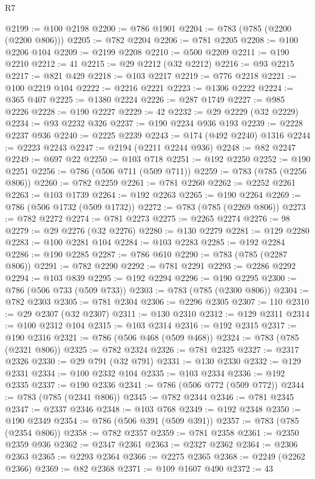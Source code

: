 \begin{lexlean}{R7}
\begin{coremodule}
@2199 := @100 @2198
@2200 := @786 @1901
@2204 := @783 (@785 (@2200 (@2200 @806)))
@2205 := @782 @2204
@2206 := @781 @2205
@2208 := @100 @2206 @104
@2209 := @2199 @2208
@2210 := @500 @2209
@2211 := @190 @2210
@2212 := 41
@2215 := @29 @2212 (@32 @2212)
@2216 := @93 @2215
@2217 := @821 @429
@2218 := @103 @2217
@2219 := @776 @2218
@2221 := @100 @2219 @104
@2222 := @2216 @2221
@2223 := @1306 @2222
@2224 := @365 @407
@2225 := @1380 @2224
@2226 := @287 @1749
@2227 := @985 @2226
@2228 := @190 @2227
@2229 := 42
@2232 := @29 @2229 (@32 @2229)
@2234 := @93 @2232 @326
@2237 := @190 @2234 @936 @193
@2239 := @2228 @2237 @936
@2240 := @2225 @2239
@2243 := @174 (@492 @2240) @1316
@2244 := @2223 @2243
@2247 := @2194 (@2211 @2244 @936)
@2248 := @82 @2247
@2249 := @697 @22
@2250 := @103 @718
@2251 := @192 @2250
@2252 := @190 @2251
@2256 := @786 (@506 @711 (@509 @711))
@2259 := @783 (@785 (@2256 @806))
@2260 := @782 @2259
@2261 := @781 @2260
@2262 := @2252 @2261
@2263 := @103 @1739
@2264 := @192 @2263
@2265 := @190 @2264
@2269 := @786 (@506 @1732 (@509 @1732))
@2272 := @783 (@785 (@2269 @806))
@2273 := @782 @2272
@2274 := @781 @2273
@2275 := @2265 @2274
@2276 := 98
@2279 := @29 @2276 (@32 @2276)
@2280 := @130 @2279
@2281 := @129 @2280
@2283 := @100 @2281 @104
@2284 := @103 @2283
@2285 := @192 @2284
@2286 := @190 @2285
@2287 := @786 @610
@2290 := @783 (@785 (@2287 @806))
@2291 := @782 @2290
@2292 := @781 @2291
@2293 := @2286 @2292
@2294 := @103 @839
@2295 := @192 @2294
@2296 := @190 @2295
@2300 := @786 (@506 @733 (@509 @733))
@2303 := @783 (@785 (@2300 @806))
@2304 := @782 @2303
@2305 := @781 @2304
@2306 := @2296 @2305
@2307 := 110
@2310 := @29 @2307 (@32 @2307)
@2311 := @130 @2310
@2312 := @129 @2311
@2314 := @100 @2312 @104
@2315 := @103 @2314
@2316 := @192 @2315
@2317 := @190 @2316
@2321 := @786 (@506 @468 (@509 @468))
@2324 := @783 (@785 (@2321 @806))
@2325 := @782 @2324
@2326 := @781 @2325
@2327 := @2317 @2326
@2330 := @29 @791 (@32 @791)
@2331 := @130 @2330
@2332 := @129 @2331
@2334 := @100 @2332 @104
@2335 := @103 @2334
@2336 := @192 @2335
@2337 := @190 @2336
@2341 := @786 (@506 @772 (@509 @772))
@2344 := @783 (@785 (@2341 @806))
@2345 := @782 @2344
@2346 := @781 @2345
@2347 := @2337 @2346
@2348 := @103 @768
@2349 := @192 @2348
@2350 := @190 @2349
@2354 := @786 (@506 @391 (@509 @391))
@2357 := @783 (@785 (@2354 @806))
@2358 := @782 @2357
@2359 := @781 @2358
@2361 := @2350 @2359 @936
@2362 := @2347 @2361
@2363 := @2327 @2362
@2364 := @2306 @2363
@2365 := @2293 @2364
@2366 := @2275 @2365
@2368 := @2249 (@2262 @2366)
@2369 := @82 @2368
@2371 := @109 @1607 @490
@2372 := 43

\end{coremodule}
\end{lexlean}
